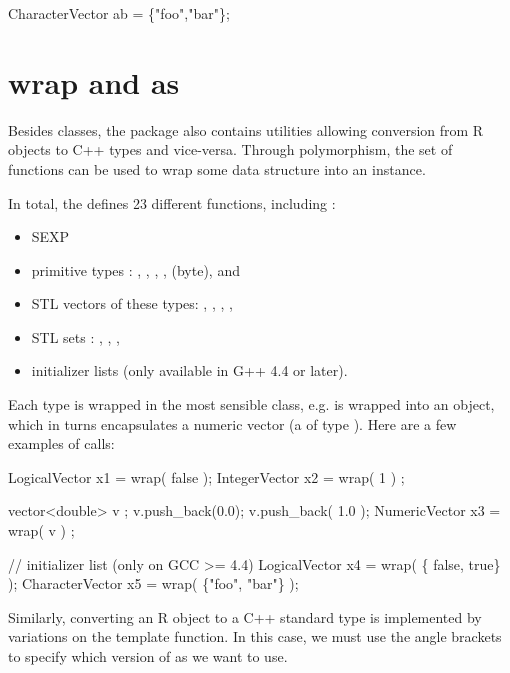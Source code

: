 \begin{example}
CharacterVector ab = \{"foo","bar"\};
\end{example}


\section{wrap and as}

Besides classes, the  package also contains utilities allowing
conversion from R objects to C++ types and vice-versa. Through 
polymorphism, the  set of functions can be used to wrap 
some data structure into an  instance. 

In total, the  defines 23 different  
functions, including :
\begin{itemize}
\item SEXP
\item primitive types : , , , 
,  (byte),  and
\item STL vectors of these types: ,
, , , 
\item STL sets : , , , 
\item initializer lists (only available in G++ 4.4 or later).
\end{itemize}

Each type is wrapped in the most sensible class, e.g. 
is wrapped into an  object, which in turns encapsulates
a numeric vector (a  of type ). 
Here are a few examples of  calls: 

\begin{example}
LogicalVector x1 = wrap( false ); 
IntegerVector x2 = wrap( 1 ) ;    

vector<double> v ; 
v.push_back(0.0); v.push_back( 1.0 ); 
NumericVector x3 = wrap( v ) ;  

// initializer list (only on GCC >= 4.4)
LogicalVector x4 = wrap( \{ false, true\} );
CharacterVector x5 = wrap( \{"foo", "bar"\} );
\end{example}

Similarly, converting an R object to a C++ standard type is implemented
by variations on the  template function. In this case, we must 
use the angle brackets to specify which version of as we want to use. 

